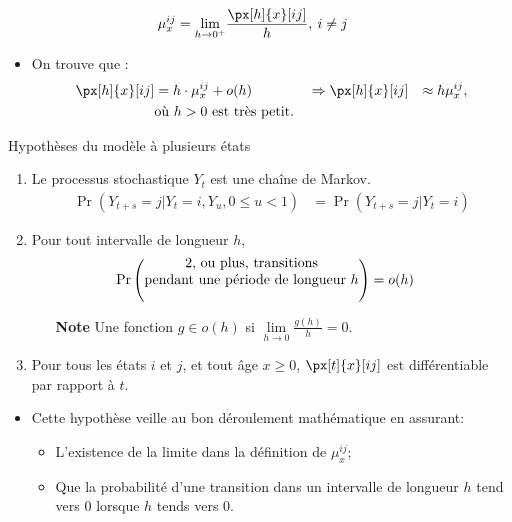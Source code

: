 \documentclass[10pt, french]{article}
\begin{document}
\begin{multicols*}{2}
\begin{description}
		\begin{align*}
		\mu_{x}^{ij}
		&=	\limz{h}{0^{+}} \frac{\px[h]{x}[ij]}{h}, \: i \neq j
		\end{align*}
		\begin{itemize}[leftmargin = *]
		\item	On trouve que :
			\begin{align*}
			\px[h]{x}[ij]	&=	h\cdot \mu_{x}^{ij} + o(h)		&
			&\Rightarrow		\px[h]{x}[ij]	&\approx	h\mu_{x}^{ij}, \\
			&\text{où } h > 0 \text{ est très petit.}
			\end{align*}
		\end{itemize}
\end{description}

\begin{rappel}{Hypothèses du modèle à plusieurs états} 
\begin{enumerate}
	\item	Le processus stochastique $Y_{t}$ est une chaîne de Markov.
		\begin{align*}
		\Pr(Y_{t + s} = j | Y_{t} = i, Y_{u}, 0 \leq u < 1) &= \Pr(Y_{t + s} = j | Y_{t} = i)
		\end{align*}
	\item	Pour tout intervalle de longueur $h$,
		\begin{align*}
		\Pr\left( \shortstack{2, ou plus, transitions\\ pendant une période de longueur $h$} \right)	&=	o(h)	
		\end{align*}
		\begin{itemize}[leftmargin = *]
		\item[\textbf{Note}]	Une fonction $g \in o(h)$ si $\underset{h \rightarrow 0}{\lim} \frac{g(h)}{h} = 0$.
		\end{itemize}
	\item	Pour tous les états $i$ et $j$, et tout âge $x \geq 0$, $\px[t]{x}[ij]$ est différentiable par rapport à $t$.
\end{enumerate}
\begin{itemize}[leftmargin = *]
\item	Cette hypothèse veille au bon déroulement mathématique en assurant:
	\begin{itemize}[leftmargin = *]
	\item	L'existence de la limite dans la définition de $\mu_{x}^{ij}$;
	\item	Que la probabilité d'une transition dans un intervalle de longueur $h$ tend vers 0 lorsque $h$ tends vers 0.
	\end{itemize}
\end{itemize}
\end{rappel}


\end{multicols*}
\end{document}

